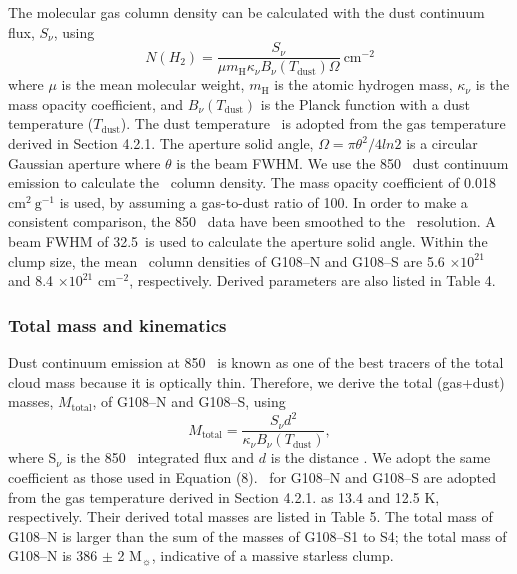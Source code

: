 \documentclass[manuscript]{aastex}
\begin{document}
 The molecular gas column density can be calculated with the dust continuum flux, $S_{\nu}$, using
\begin{equation}
N(H_2) = \frac{S_{\nu}}{{\mu}m_{\textrm{H}}{\kappa}_{\nu}B_{\nu}(T_{\textrm{dust}}){\Omega}}\ \textrm{cm}^{-2}
\end{equation}
where $\mu$ is the mean molecular weight, $m_{\textrm{H}}$ is the atomic hydrogen mass, ${\kappa}_{\nu}$ is the mass opacity coefficient, and $B_{\nu}(T_{\textrm{dust}})$ is the Planck function with a dust temperature ($T_{\textrm{dust}}$).
The dust temperature \td\ is adopted from the gas temperature derived in Section 4.2.1.
The aperture solid angle, $\Omega=\pi\theta^2/4 ln2$ is a circular Gaussian aperture where $\theta$ is the beam FWHM.
We use the 850 \m\ dust continuum emission to calculate the \atomh\ column density.
The mass opacity coefficient of 0.018 ${\textrm{cm}}^2 \ {\textrm{g}}^{-1}$ \citep{ossenkopf94} is used, by assuming a gas-to-dust ratio of 100.
In order to make a consistent comparison, the 850 \m\ data have been smoothed to the \ceot\ resolution.
A beam FWHM of 32.5\arcsec\ is used to calculate the aperture solid angle.
Within the clump size, the mean \atomh\ column densities of G108--N and G108--S are 5.6 $\times 10^{21}$ and 8.4 $\times 10^{21}$ cm$^{-2}$, respectively.
Derived parameters are also listed in Table 4.

\subsubsection{Total mass and kinematics}
Dust continuum emission at 850 \m\ is known as one of the best tracers of the total cloud mass because it is optically thin.
Therefore, we derive the total (gas+dust) masses, $M_{\textrm{total}}$, of G108--N and G108--S, using
\begin{equation}
M_{\textrm{total}} = \frac{S_{\nu}{d}^{2}}{{\kappa}_{\nu}B_{\nu}(T_{\textrm{dust}})},
\end{equation}
where S$_{\nu}$ is the 850 \m\ integrated flux and $d$ is the distance \citep[3.21 $\pm$ 0.21 kpc;][]{ramirez11}.
We adopt the same coefficient as those used in Equation (8).
\td\ for G108--N and G108--S are adopted from the gas temperature derived in Section 4.2.1. as 13.4 and 12.5 K, respectively.
Their derived total masses are listed in Table 5.
The total mass of G108--N is larger than the sum of the masses of G108--S1 to S4; the total mass of G108--N is 386 $\pm$ 2 M$_{\sun}$, indicative of a massive starless clump.
\end{document}
